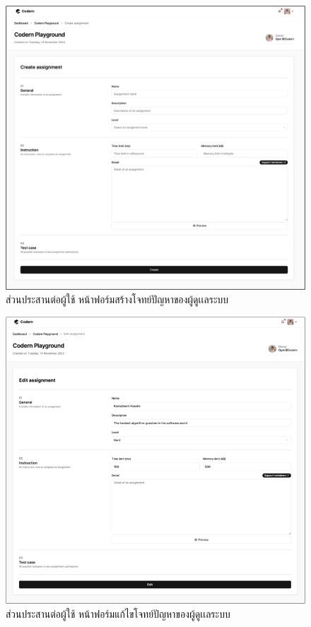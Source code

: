 \documentclass[12pt,one side,openright,a4paper]{cpe-thesis-th}
\begin{document}
\hypertarget{ui-assign3}{
  \begin{figure}[H]
    \centering
    \includegraphics[width=15cm]{figure/ui/ui-assign3.png}
    \caption[ส่วนประสานต่อผู้ใช้ หน้าฟอร์มสร้างโจทย์ปัญหาของผู้ดูเเลระบบ]{ ส่วนประสานต่อผู้ใช้ หน้าฟอร์มสร้างโจทย์ปัญหาของผู้ดูเเลระบบ}
    \label{fig:ui-assign3}
  \end{figure}
}
\hypertarget{ui-assign4}{
  \begin{figure}[H]
    \centering
    \includegraphics[width=15cm]{figure/ui/ui-assign4.png}
    \caption[ส่วนประสานต่อผู้ใช้ หน้าฟอร์มแก้ไขโจทย์ปัญหาของผู้ดูเเลระบบ]{ ส่วนประสานต่อผู้ใช้ หน้าฟอร์มแก้ไขโจทย์ปัญหาของผู้ดูเเลระบบ}
    \label{fig:ui-assign4}
  \end{figure}
}
\end{document}
